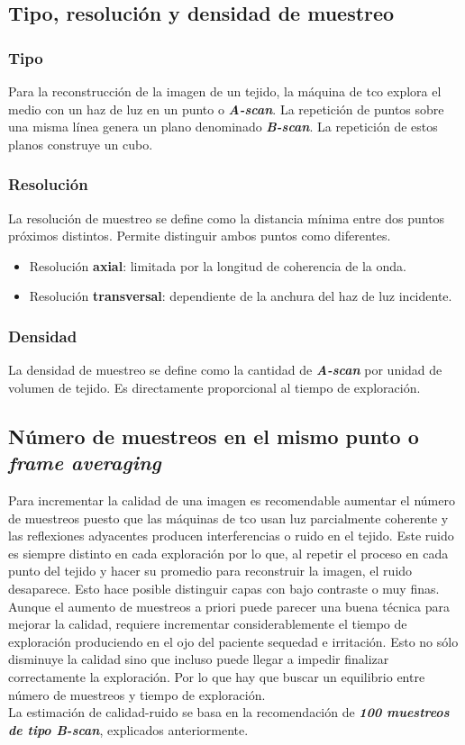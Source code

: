 \subsection{Tipo, resolución y densidad de muestreo}\label{tco:trd}
\subsubsection{Tipo}
Para la reconstrucción de la imagen de un tejido, la máquina de
\gls{tco} explora el medio con un haz de luz en un punto o
\emph{\textbf{A-scan}}. La repetición de puntos sobre una misma línea
genera un plano denominado \emph{\textbf{B-scan}}. La repetición de
estos planos construye un cubo.
\subsubsection{Resolución}
La resolución de muestreo se define como la distancia mínima entre dos
puntos próximos distintos. Permite distinguir ambos puntos como
diferentes.
\begin{itemize}
\item Resolución \textbf{axial}: limitada por la longitud de
  coherencia de la onda.
\item Resolución \textbf{transversal}: dependiente de la anchura del
  haz de luz incidente.
\end{itemize}
\subsubsection{Densidad}
La densidad de muestreo se define como la cantidad de
\emph{\textbf{A-scan}} por unidad de volumen de tejido. Es
directamente proporcional al tiempo de exploración.

\subsection{Número de muestreos en el mismo punto o \emph{frame
    averaging}}\label{tco:frame}
Para incrementar la calidad de una imagen es recomendable aumentar el
número de muestreos puesto que las máquinas de \gls{tco} usan luz
parcialmente coherente y las reflexiones adyacentes producen
interferencias o ruido en el tejido. Este ruido es siempre distinto en
cada exploración por lo que, al repetir el proceso en cada punto del
tejido y hacer su promedio para reconstruir la imagen, el ruido
desaparece. Esto hace posible distinguir capas con bajo contraste o
muy finas.\\
Aunque el aumento de muestreos a priori puede parecer una buena
técnica para mejorar la calidad, requiere incrementar
considerablemente el tiempo de exploración produciendo en el ojo del
paciente sequedad e irritación. Esto no sólo disminuye la calidad sino
que incluso puede llegar a impedir finalizar correctamente la
exploración. Por lo que hay que buscar un equilibrio entre número de
muestreos y tiempo de exploración.\\
La estimación de calidad-ruido se basa en la recomendación de
\emph{\textbf{100 muestreos de tipo B-scan}}, explicados
anteriormente.

